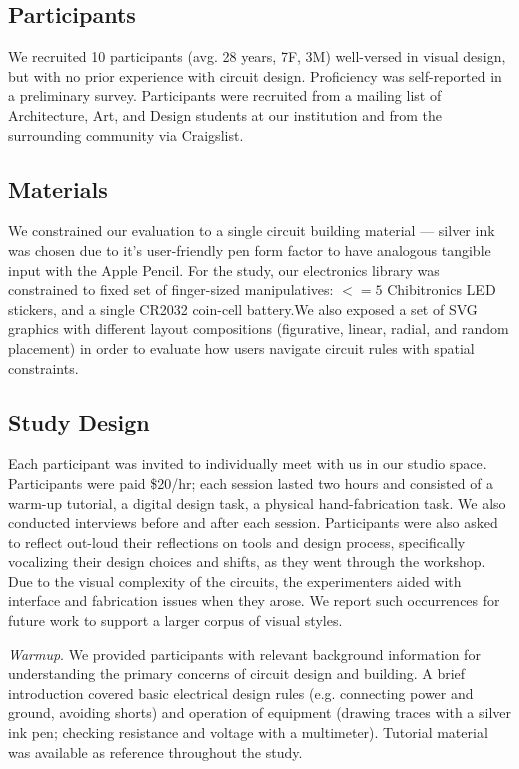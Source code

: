 \documentclass{sigchi}
\begin{document}
\subsection{Participants}
    We recruited 10 participants (avg. 28 years, 7F, 3M) well-versed in visual design, but with no prior experience with circuit design. Proficiency was self-reported in a preliminary survey. Participants were recruited from a mailing list of Architecture, Art, and Design students at our institution and from the surrounding community via Craigslist.

\subsection{Materials}
    We constrained our evaluation to a single circuit building material --- silver ink was chosen due to it's user-friendly pen form factor to have analogous tangible input with the Apple Pencil. For the study, our electronics library was constrained to fixed set of finger-sized manipulatives: $<= 5$ Chibitronics LED stickers, and a single CR2032 coin-cell battery.We also exposed a set of SVG graphics with different layout compositions (figurative, linear, radial, and random placement) in order to evaluate how users navigate circuit rules with spatial constraints. 

\subsection{Study Design}

    Each participant was invited to individually meet with us in our studio space. Participants were paid \$20/hr; each session lasted two hours and consisted of a warm-up tutorial, a digital design task, a physical hand-fabrication task. We also conducted interviews before and after each session. Participants were also asked to reflect out-loud their reflections on tools and design process, specifically vocalizing their design choices and shifts, as they went through the workshop. Due to the visual complexity of the circuits, the experimenters aided with interface and fabrication issues when they arose. We report such occurrences for future work to support a larger corpus of visual styles. 

    \textit{Warmup}. We provided participants with relevant background information for understanding the primary concerns of circuit design and building. A brief introduction covered basic electrical design rules (e.g. connecting power and ground, avoiding shorts) and operation of equipment (drawing traces with a silver ink pen; checking resistance and voltage with a multimeter). Tutorial material was available as reference throughout the study. 
\end{document}
